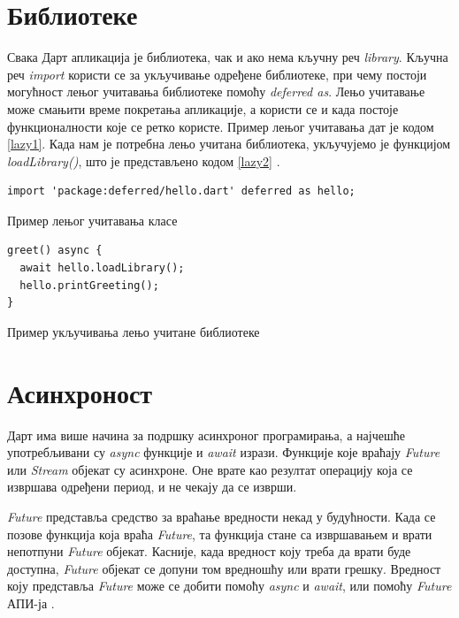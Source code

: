\documentclass[12pt,oneside]{memoir}
\begin{document}
\section{Библиотеке}
\label{dart_biblioteke}
Свака Дарт апликација је библиотека, чак и ако нема кључну реч \textit{library}. Кључна реч \textit{import} користи се за укључивање одређене библиотеке, при чему постоји могућност лењог учитавања библиотеке помоћу \textit{deferred as}. Лењо учитавање може смањити време покретања апликације, а користи се и када постоје функционалности које се ретко користе. Пример лењог учитавања дат је кодом \ref{lazy1}. Када нам је потребна лењо учитана библиотека, укључујемо је функцијом \textit{loadLibrary()}, што је представљено кодом \ref{lazy2} \cite{dart, dart1}.

\begin{listing}
\begin{verbatim}
import 'package:deferred/hello.dart' deferred as hello;
\end{verbatim}
\caption{Пример лењог учитавања класе}
\label{lazy1}
\end{listing}

\begin{listing}
\begin{verbatim}
greet() async {
  await hello.loadLibrary();
  hello.printGreeting();
}
\end{verbatim}
\caption{Пример укључивања лењо учитане библиотеке}
\label{lazy2}
\end{listing}

\section{Асинхроност}
\label{asinhronost}
Дарт има више начина за подршку асинхроног програмирања, а најчешће употребљивани су \textit{async} функције и \textit{await} изрази. Функције које враћају \textit{Future} или \textit{Stream} објекат су асинхроне. Оне врате као резултат операцију која се извршава одређени период, и не чекају да се изврши.

\textit{Future} представља средство за враћање вредности некад у будућности. Када се позове функција која враћа \textit{Future}, та функција стане са извршавањем и врати непотпуни \textit{Future} објекат. Касније, када вредност коју треба да врати буде доступна, \textit{Future} објекат се допуни том вредношћу или врати грешку. Вредност коју представља \textit{Future} може се добити помоћу \textit{async} и \textit{await}, или помоћу \textit{Future} АПИ-ја \cite{dart, dart1}. 
\end{document}

